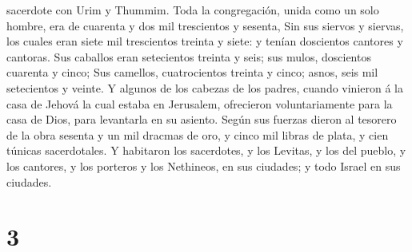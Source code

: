 sacerdote con Urim y Thummim.  Toda la congregación,
unida como un solo hombre, era de cuarenta y dos mil trescientos y
sesenta,  Sin sus siervos y siervas, los cuales eran
siete mil trescientos treinta y siete: y tenían doscientos cantores y
cantoras.  Sus caballos eran setecientos treinta y seis;
sus mulos, doscientos cuarenta y cinco;  Sus camellos,
cuatrocientos treinta y cinco; asnos, seis mil setecientos y veinte.
 Y algunos de los cabezas de los padres, cuando vinieron
á la casa de Jehová la cual estaba en Jerusalem, ofrecieron
voluntariamente para la casa de Dios, para levantarla en su asiento.
 Según sus fuerzas dieron al tesorero de la obra sesenta
y un mil dracmas de oro, y cinco mil libras de plata, y cien túnicas
sacerdotales.  Y habitaron los sacerdotes, y los Levitas,
y los del pueblo, y los cantores, y los porteros y los Nethineos, en sus
ciudades; y todo Israel en sus ciudades.

\hypertarget{section-2}{%
\section{3}\label{section-2}}

